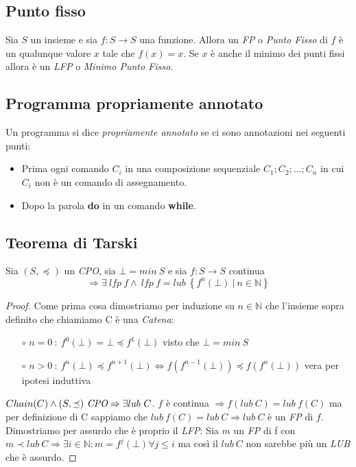 \subsection{Punto fisso}
\begin{definizione}
  Sia $S$ un insieme e sia $f : S \rightarrow S$ una funzione. Allora un \emph{FP} o \emph{Punto Fisso} di $f$ è un qualunque valore $x$ tale che $f(x) = x$.
  Se $x$ è anche il minimo dei punti fissi allora è un \emph{LFP} o \emph{Minimo Punto Fisso}.
\end{definizione}

\subsection{Programma propriamente annotato}
\begin{definizione}
Un programma si dice \emph{propriamente annotato} se ci sono annotazioni nei seguenti punti:
\begin{itemize}
	\item Prima ogni comando $C_i$ in una composizione sequenziale $C_1;C_2; \dots ;C_n$ in cui $C_i$ non è un comando di assegnamento.
	\item Dopo la parola \textbf{do} in un comando \textbf{while}.
\end{itemize}
\end{definizione}


\subsection{Teorema di Tarski}
\begin{teorema}
  Sia $(S, \preceq)$ un \emph{CPO}, sia $\bot = min\ S$ e sia $f : S \rightarrow S$ continua
  $$\Rightarrow \exists\ lfp\ f \land\ lfp\ f = lub\ \left\{f^n(\bot)\ |\ n \in \mathbb{N}\right\}$$
  \begin{proof}
    Come prima cosa dimostriamo per induzione su $n \in \mathbb{N}$ che l'insieme sopra definito che chiamiamo C è una \emph{Catena}:
    \begin{itemize}
      \item[$\circ$] $n = 0\ :\ f^0(\bot) = \bot \preceq f^1(\bot)$ visto che $\bot = min\ S$
      \item[$\circ$] $n > 0\ :\ f^n(\bot) \preceq f^{n+1}(\bot) \Longleftrightarrow f(f^{n-1}(\bot)) \preceq f(f^n(\bot))$ vera per ipotesi induttiva
    \end{itemize}
    $Chain(C) \land (S, \preceq)\ \emph{CPO} \Rightarrow \exists lub\ C$. $f$ è continua $\Rightarrow f(lub\ C) = lub\ f(C)$ ma per definizione di C sappiamo
    che $lub\ f(C) = lub\ C \Rightarrow lub\ C$ è un \emph{FP} di $f$. Dimostriamo per assurdo che è proprio il \emph{LFP}:
    Sia $m$ un \emph{FP} di f con $m \prec lub\ C \Rightarrow \exists i \in \mathbb{N} : m = f^j(\bot) \forall j \leq i$ ma così il $lub\ C$ non sarebbe più
    un \emph{LUB} che è assurdo.
  \end{proof}
\end{teorema}


